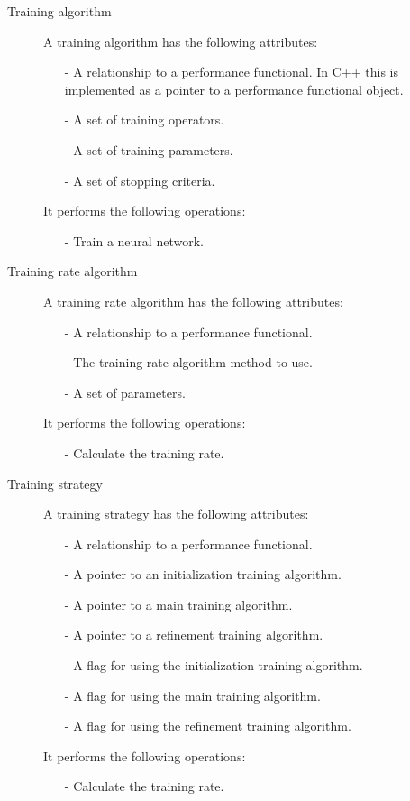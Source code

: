 \begin{description}

\item[Training algorithm] A training algorithm has the following attributes:

\begin{itemize}
\item[-] A relationship to a performance functional. In C++ this is implemented as a pointer to a performance functional object.
\item[-] A set of training operators.
\item[-] A set of training parameters.
\item[-] A set of stopping criteria.
\end{itemize}

It performs the following operations:

\begin{itemize}
\item[-] Train a neural network.
\end{itemize}

\item[Training rate algorithm] A training rate algorithm has the following attributes:

\begin{itemize}
\item[-] A relationship to a performance functional. 
\item[-] The training rate algorithm method to use.
\item[-] A set of parameters.
\end{itemize}

It performs the following operations:

\begin{itemize}
\item[-] Calculate the training rate.
\end{itemize}

\item[Training strategy] A training strategy has the following attributes:

\begin{itemize}
\item[-] A relationship to a performance functional. 
\item[-] A pointer to an initialization training algorithm.
\item[-] A pointer to a main training algorithm.
\item[-] A pointer to a refinement training algorithm.
\item[-] A flag for using the initialization training algorithm.
\item[-] A flag for using the main training algorithm.
\item[-] A flag for using the refinement training algorithm.
\end{itemize}

It performs the following operations:

\begin{itemize}
\item[-] Calculate the training rate.
\end{itemize}

\end{description}
